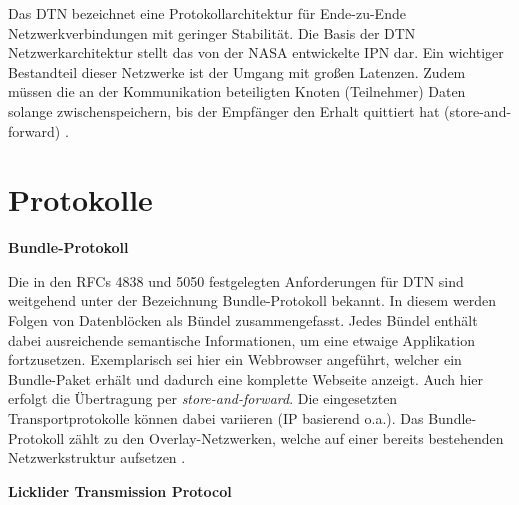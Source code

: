 Das \gls{DTN} bezeichnet eine Protokollarchitektur f{\"u}r
Ende-zu-Ende Netzwerkverbindungen mit geringer Stabilit{\"a}t. Die Basis der
\gls{DTN} Netzwerkarchitektur stellt das von der NASA entwickelte \gls{IPN} dar. Ein wichtiger
Bestandteil dieser Netzwerke ist der Umgang mit gro{\ss}en Latenzen. Zudem
m{\"u}ssen die an der Kommunikation beteiligten Knoten (Teilnehmer)
Daten solange zwischenspeichern, bis der Empf{\"a}nger den Erhalt quittiert hat
(store-and-forward) \cite{web3}.

\section{Protokolle}

\textbf{Bundle-Protokoll}

Die in den RFCs 4838 und 5050 festgelegten Anforderungen f{\"u}r \gls{DTN} sind
weitgehend unter der Bezeichnung Bundle-Protokoll bekannt. In diesem werden
Folgen von Datenbl{\"o}cken als B{\"u}ndel zusammengefasst. Jedes B{\"u}ndel enth{\"a}lt
dabei ausreichende semantische Informationen, um eine etwaige Applikation
fortzusetzen. Exemplarisch sei hier ein Webbrowser angef{\"u}hrt, welcher ein
Bundle-Paket erh{\"a}lt und dadurch eine komplette Webseite anzeigt. Auch hier
erfolgt die {\"U}bertragung per \textit{store-and-forward}. Die eingesetzten
Transportprotokolle k{\"o}nnen dabei variieren (\gls{IP} basierend o.a.). Das
Bundle-Protokoll z{\"a}hlt zu den Overlay-Netzwerken, welche
auf einer bereits bestehenden Netzwerkstruktur aufsetzen \cite{web1}.

\textbf{Licklider Transmission Protocol}

